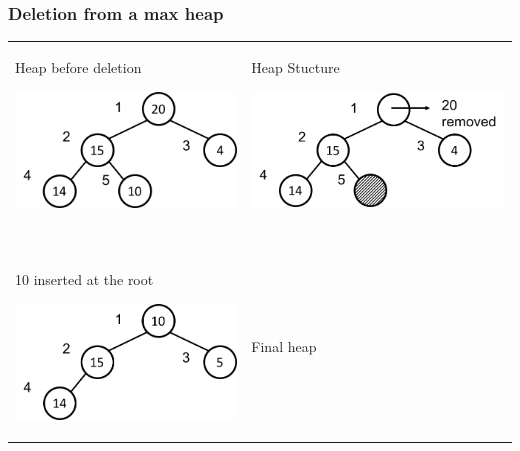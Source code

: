 \documentclass[newPxFont,sthlmFooter,nooffset]{beamer}
\begin{document}
\begin{frame}[t]
  \frametitle{Deletion from a max heap}
  \begin{tabular}{p{} p{}}
Heap before deletion

    \includegraphics[height=0.3\textheight]{./figures/fig14_heap_delete.png}
&    
Heap Stucture

    \includegraphics[height=0.3\textheight]{./figures/fig14_heap_delete1.png}
\pause \\
~& ~\\
10 inserted at the root

    \includegraphics[height=0.3\textheight]{./figures/fig14_heap_delete2.png}
&
Final heap


\end{tabular}
\end{frame}
\end{document}

